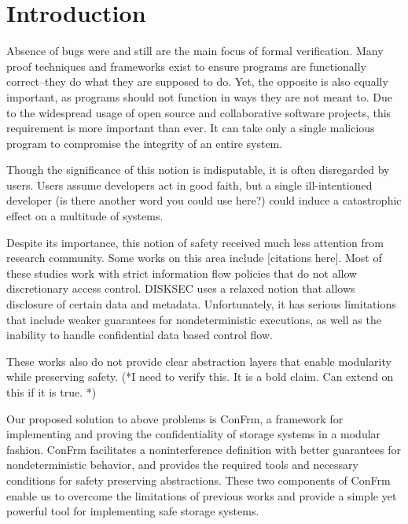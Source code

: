 \section{Introduction}

Absence of bugs were and still are the main focus of formal verification. Many proof techniques and frameworks exist to ensure programs are functionally correct–they do what they are supposed to do. Yet, the opposite is also equally important, as programs should not function in ways they are not meant to. Due to the widespread usage of open source and collaborative software projects, this requirement is more important than ever. It can take only a single malicious program to compromise the integrity of an entire system. 

Though the significance of this notion is indisputable, it is often disregarded by users. Users assume developers act in good faith, but a single ill-intentioned developer {\color{red}(is there another word you could use here?)} could induce a catastrophic effect on a multitude of systems.


Despite its importance, this notion of safety received much less attention from research community. Some works on this area include [citations here]. Most of these studies work with strict information flow policies that do not allow discretionary access control. DISKSEC uses a relaxed notion that allows disclosure of certain data and metadata. Unfortunately, it has serious limitations that include weaker guarantees for nondeterministic executions, as well as the inability to handle confidential data based control flow. 

These works also do not provide clear abstraction layers that enable modularity while preserving safety. (*I need to verify this. It is a bold claim. Can extend on this if it is true. *) 

Our proposed solution to above problems is ConFrm, a framework for implementing and proving the confidentiality of storage systems in a modular fashion. ConFrm facilitates a noninterference definition with better guarantees for nondeterministic behavior, and provides the required tools and necessary conditions for safety preserving abstractions. These two components of ConFrm enable us to overcome the limitations of previous works and provide a simple yet powerful tool for implementing safe storage systems. 

